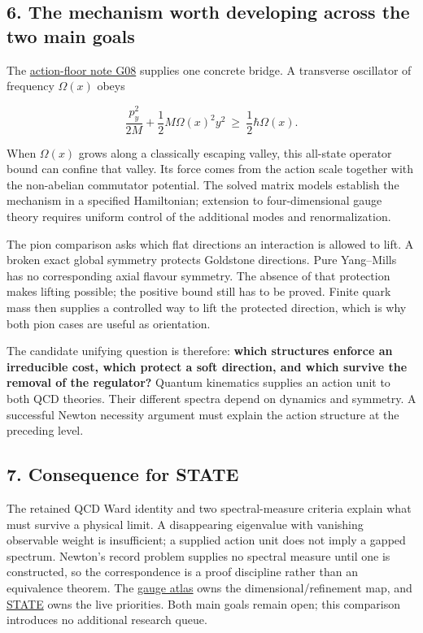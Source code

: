 \documentclass[11pt,a4paper]{article}
\begin{document}
\hypertarget{the-mechanism-worth-developing-across-the-two-main-goals}{%
\subsection{6. The mechanism worth developing across the two main
goals}\label{the-mechanism-worth-developing-across-the-two-main-goals}}

The
\href{low-dimensional-mass-gap.md\#conditional-orbit-area-bounds-and-state-counting}{action-floor
note G08} supplies one concrete bridge. A transverse oscillator of
frequency \(\Omega(x)\) obeys

\[\frac{p_y^2}{2M}+\frac12M\Omega(x)^2y^2
\ \ge\ \frac12\hbar\Omega(x).\]

When \(\Omega(x)\) grows along a classically escaping valley, this
all-state operator bound can confine that valley. Its force comes from
the action scale together with the non-abelian commutator potential. The
solved matrix models establish the mechanism in a specified Hamiltonian;
extension to four-dimensional gauge theory requires uniform control of
the additional modes and renormalization.

The pion comparison asks which flat directions an interaction is allowed
to lift. A broken exact global symmetry protects Goldstone directions.
Pure Yang--Mills has no corresponding axial flavour symmetry. The
absence of that protection makes lifting possible; the positive bound
still has to be proved. Finite quark mass then supplies a controlled way
to lift the protected direction, which is why both pion cases are useful
as orientation.

The candidate unifying question is therefore: \textbf{which structures
enforce an irreducible cost, which protect a soft direction, and which
survive the removal of the regulator?} Quantum kinematics supplies an
action unit to both QCD theories. Their different spectra depend on
dynamics and symmetry. A successful Newton necessity argument must
explain the action structure at the preceding level.

\hypertarget{consequence-for-state}{%
\subsection{7. Consequence for STATE}\label{consequence-for-state}}

The retained QCD Ward identity and two spectral-measure criteria explain
what must survive a physical limit. A disappearing eigenvalue with
vanishing observable weight is insufficient; a supplied action unit does
not imply a gapped spectrum. Newton's record problem supplies no
spectral measure until one is constructed, so the correspondence is a
proof discipline rather than an equivalence theorem. The
\href{halving-atlas.md}{gauge atlas} owns the dimensional/refinement
map, and \href{../research/STATE.md}{STATE} owns the live priorities.
Both main goals remain open; this comparison introduces no additional
research queue.
\end{document}
